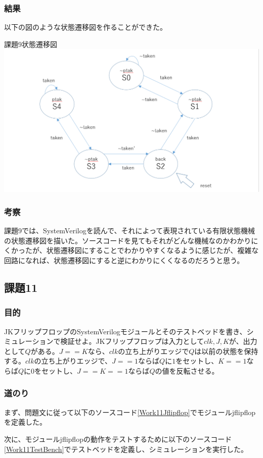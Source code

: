 \documentclass[a4paper]{jarticle}
\begin{document}
\subsubsection{結果}
以下の図のような状態遷移図を作ることができた。
\begin{center}
	課題9状態遷移図
	\includegraphics[width=15cm]{9.PNG}
\end{center}
\subsubsection{考察}
課題9では、SystemVerilogを読んで、それによって表現されている有限状態機械の状態遷移図を描いた。ソースコードを見てもそれがどんな機械なのかわかりにくかったが、状態遷移図にすることでわかりやすくなるように感じたが、複雑な回路になれば、状態遷移図にすると逆にわかりにくくなるのだろうと思う。
\subsection{課題11}
\subsubsection{目的}
JKフリップフロップのSystemVerilogモジュールとそのテストベッドを書き、シミュレーションで検証せよ。JKフリップフロップは入力として$clk,J,K$が、出力として$Q$がある。$J==K$なら、$clk$の立ち上がりエッジで$Q$は以前の状態を保持する。$clk$の立ち上がりエッジで、$J==1$ならば$Q$に$1$をセットし、$K==1$ならば$Q$に$0$をセットし、$J==K==1$ならば$Q$の値を反転させる。
\subsubsection{道のり}
まず、問題文に従って以下のソースコード\ref{Work11Jflipflop}でモジュールjflipflopを定義した。

次に、モジュールjflipflopの動作をテストするために以下のソースコード\ref{Work11TestBench}でテストベッドを定義し、シミュレーションを実行した。

\end{document}
